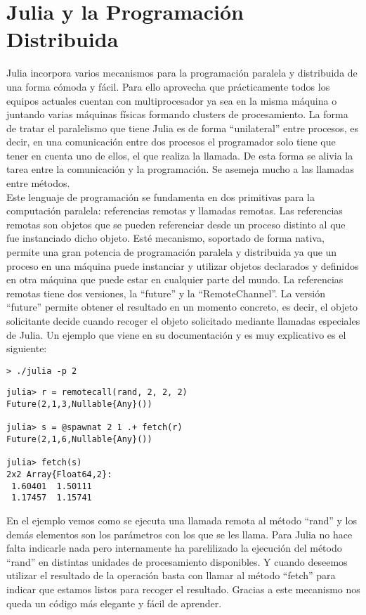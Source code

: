 \documentclass[10pt,a4paper]{article}
\begin{document}
\section{Julia y la Programación Distribuida}
Julia incorpora varios mecanismos para la programación paralela y distribuida de una forma cómoda y fácil. Para ello aprovecha que prácticamente todos los equipos actuales cuentan con multiprocesador ya sea en la misma máquina o juntando varias máquinas físicas formando clusters de procesamiento. La forma de tratar el paralelismo que tiene Julia es de forma ``unilateral'' entre procesos, es decir, en una comunicación entre dos procesos el programador solo tiene que tener en cuenta uno de ellos, el que realiza la llamada. De esta forma se alivia la tarea entre la comunicación y la programación. Se asemeja mucho a las llamadas entre métodos.\\

Este lenguaje de programación se fundamenta en dos primitivas para la computación paralela: referencias remotas y llamadas remotas. Las referencias remotas son objetos que se pueden referenciar desde un proceso distinto al que fue instanciado dicho objeto. Esté mecanismo, soportado de forma nativa, permite una gran potencia de programación paralela y distribuida ya que un proceso en una máquina puede instanciar y utilizar objetos declarados y definidos en otra máquina que puede estar en cualquier parte del mundo. La referencias remotas tiene dos versiones, la ``future'' y la ``RemoteChannel''. La versión ``future'' permite obtener el resultado en un momento concreto, es decir, el objeto solicitante decide cuando recoger el objeto solicitado mediante llamadas especiales de Julia. Un ejemplo que viene en su documentación y es muy explicativo es el siguiente:\\

\begin{verbatim}
> ./julia -p 2
\end{verbatim}

\begin{verbatim}
julia> r = remotecall(rand, 2, 2, 2)
Future(2,1,3,Nullable{Any}())

julia> s = @spawnat 2 1 .+ fetch(r)
Future(2,1,6,Nullable{Any}())

julia> fetch(s)
2x2 Array{Float64,2}:
 1.60401  1.50111
 1.17457  1.15741
\end{verbatim}

En el ejemplo vemos como se ejecuta una llamada remota al método ``rand'' y los demás elementos son los parámetros con los que se les llama. Para Julia no hace falta indicarle nada pero internamente ha parelilizado la ejecución del método ``rand'' en distintas unidades de procesamiento disponibles. Y cuando deseemos utilizar el resultado de la operación basta con llamar al método ``fetch'' para indicar que estamos listos para recoger el resultado. Gracias a este mecanismo nos queda un código más elegante y fácil de aprender. \\
\end{document}
